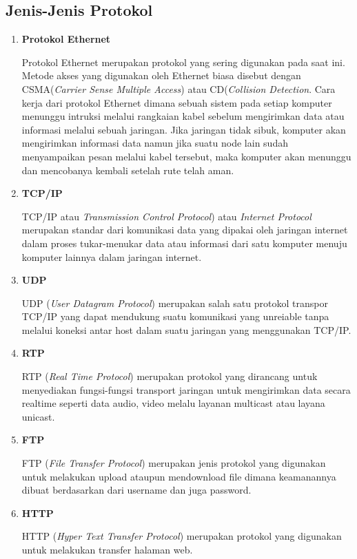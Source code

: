 \subsection{Jenis-Jenis Protokol}
\begin{enumerate}
\item \textbf{Protokol Ethernet}

Protokol Ethernet merupakan protokol yang sering digunakan pada saat ini. Metode akses yang digunakan oleh Ethernet biasa disebut dengan CSMA(\textit{Carrier Sense Multiple Access}) atau CD(\textit{Collision Detection}. Cara kerja dari protokol Ethernet dimana sebuah sistem pada setiap komputer menunggu intruksi melalui rangkaian kabel sebelum mengirimkan data atau informasi melalui sebuah jaringan. Jika jaringan tidak sibuk, komputer akan mengirimkan informasi data namun jika suatu node lain sudah menyampaikan pesan melalui kabel tersebut, maka komputer akan menunggu dan mencobanya kembali setelah rute telah aman. 
\item \textbf{TCP/IP}

TCP/IP atau \textit{Transmission Control Protocol}) atau \textit{Internet Protocol} merupakan standar dari komunikasi data yang dipakai oleh jaringan internet dalam proses tukar-menukar data atau informasi dari satu komputer menuju komputer lainnya dalam jaringan internet. 
\item \textbf{UDP}

UDP (\textit{User Datagram Protocol}) merupakan salah satu protokol transpor TCP/IP yang dapat mendukung suatu komunikasi yang unreiable tanpa melalui koneksi antar host dalam suatu jaringan yang menggunakan TCP/IP.
\item \textbf{RTP}

RTP (\textit{Real Time Protocol}) merupakan protokol yang dirancang untuk menyediakan fungsi-fungsi transport jaringan untuk mengirimkan data secara realtime seperti data audio, video melalu layanan multicast atau layana unicast.
\item \textbf{FTP}

FTP (\textit{File Transfer Protocol}) merupakan jenis protokol yang digunakan untuk melakukan upload ataupun mendownload file dimana keamanannya dibuat berdasarkan dari username dan juga password.
\item \textbf{HTTP}

HTTP (\textit{Hyper Text Transfer Protocol}) merupakan protokol yang digunakan untuk melakukan transfer halaman web.
\end{enumerate}


 
